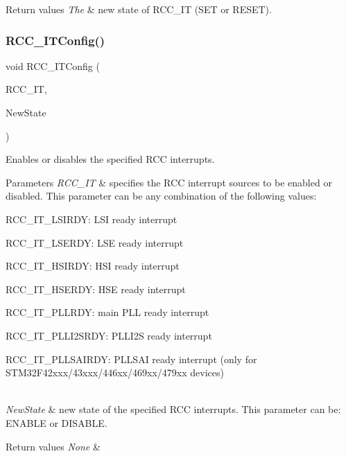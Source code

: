 \begin{DoxyRetVals}{Return values}
{\em The} & new state of R\+C\+C\+\_\+\+IT (S\+ET or R\+E\+S\+ET). \\
\hline
\end{DoxyRetVals}
\mbox{\label{group___r_c_c___group4_gaa953aa226e9ce45300d535941e4dfe2f}} 
\subsubsection{\texorpdfstring{R\+C\+C\+\_\+\+I\+T\+Config()}{RCC\_ITConfig()}}
{\footnotesize\ttfamily void R\+C\+C\+\_\+\+I\+T\+Config (\begin{DoxyParamCaption}\item[{uint8\+\_\+t}]{R\+C\+C\+\_\+\+IT,  }\item[{Functional\+State}]{New\+State }\end{DoxyParamCaption})}



Enables or disables the specified R\+CC interrupts. 


\begin{DoxyParams}{Parameters}
{\em R\+C\+C\+\_\+\+IT} & specifies the R\+CC interrupt sources to be enabled or disabled. This parameter can be any combination of the following values\+: \begin{DoxyItemize}
\item R\+C\+C\+\_\+\+I\+T\+\_\+\+L\+S\+I\+R\+DY\+: L\+SI ready interrupt \item R\+C\+C\+\_\+\+I\+T\+\_\+\+L\+S\+E\+R\+DY\+: L\+SE ready interrupt \item R\+C\+C\+\_\+\+I\+T\+\_\+\+H\+S\+I\+R\+DY\+: H\+SI ready interrupt \item R\+C\+C\+\_\+\+I\+T\+\_\+\+H\+S\+E\+R\+DY\+: H\+SE ready interrupt \item R\+C\+C\+\_\+\+I\+T\+\_\+\+P\+L\+L\+R\+DY\+: main P\+LL ready interrupt \item R\+C\+C\+\_\+\+I\+T\+\_\+\+P\+L\+L\+I2\+S\+R\+DY\+: P\+L\+L\+I2S ready interrupt \item R\+C\+C\+\_\+\+I\+T\+\_\+\+P\+L\+L\+S\+A\+I\+R\+DY\+: P\+L\+L\+S\+AI ready interrupt (only for S\+T\+M32\+F42xxx/43xxx/446xx/469xx/479xx devices) \end{DoxyItemize}
\\
\hline
{\em New\+State} & new state of the specified R\+CC interrupts. This parameter can be\+: E\+N\+A\+B\+LE or D\+I\+S\+A\+B\+LE. \\
\hline
\end{DoxyParams}

\begin{DoxyRetVals}{Return values}
{\em None} & \\
\hline
\end{DoxyRetVals}
